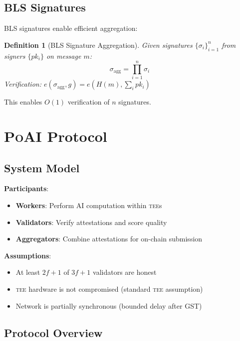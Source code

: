 \documentclass[11pt,letterpaper]{article}
\newtheorem{definition}{Definition}[section]
\newcommand{\PoAI}{\textsc{PoAI}}
\newcommand{\TEE}{\textsc{tee}}
\begin{document}
\subsection{BLS Signatures}

BLS signatures enable efficient aggregation:

\begin{definition}[BLS Signature Aggregation]
Given signatures $\{\sigma_i\}_{i=1}^n$ from signers $\{pk_i\}$ on message $m$:
\begin{equation}
\sigma_{\text{agg}} = \prod_{i=1}^n \sigma_i
\end{equation}
Verification: $e(\sigma_{\text{agg}}, g) = e(H(m), \sum_i pk_i)$
\end{definition}

This enables $O(1)$ verification of $n$ signatures.

\section{\PoAI{} Protocol}
\label{sec:protocol}

\subsection{System Model}

\textbf{Participants}:
\begin{itemize}
    \item \textbf{Workers}: Perform AI computation within \TEE{}s
    \item \textbf{Validators}: Verify attestations and score quality
    \item \textbf{Aggregators}: Combine attestations for on-chain submission
\end{itemize}

\textbf{Assumptions}:
\begin{itemize}
    \item At least $2f+1$ of $3f+1$ validators are honest
    \item \TEE{} hardware is not compromised (standard \TEE{} assumption)
    \item Network is partially synchronous (bounded delay after GST)
\end{itemize}

\subsection{Protocol Overview}
\end{document}
